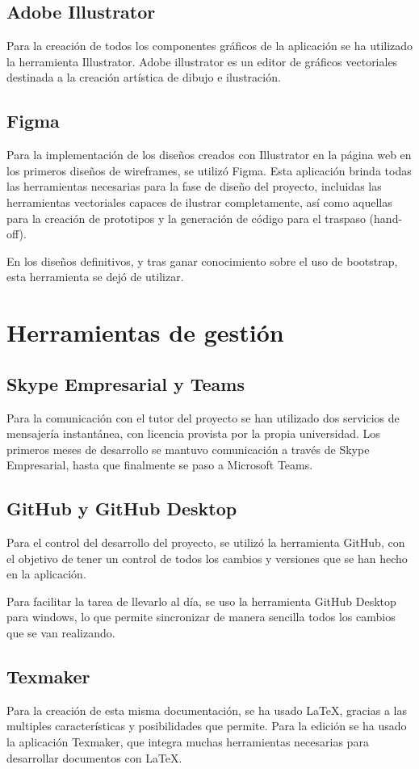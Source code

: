 \subsection{Adobe Illustrator}
Para la creación de todos los componentes gráficos de la aplicación se ha utilizado la herramienta Illustrator. Adobe illustrator es un editor de gráficos vectoriales destinada a la creación artística de dibujo e ilustración.

\subsection{Figma}
Para la implementación de los diseños creados con Illustrator en la página web en los primeros diseños de wireframes, se utilizó Figma. Esta aplicación brinda todas las herramientas necesarias para la fase de diseño del proyecto, incluidas las herramientas vectoriales capaces de ilustrar completamente, así como aquellas para la creación de prototipos y la generación de código para el traspaso (hand-off). 

En los diseños definitivos, y tras ganar conocimiento sobre el uso de bootstrap, esta herramienta se dejó de utilizar.

\section{Herramientas de gestión}

\subsection{Skype Empresarial y Teams}

Para la comunicación con el tutor del proyecto se han utilizado dos servicios de mensajería instantánea, con licencia provista por la propia universidad. Los primeros meses de desarrollo se mantuvo comunicación a través de Skype Empresarial, hasta que finalmente se paso a Microsoft Teams.

\subsection{GitHub y GitHub Desktop}

Para el control del desarrollo del proyecto, se utilizó la herramienta GitHub, con el objetivo de tener un control de todos los cambios y versiones que se han hecho en la aplicación. 

Para facilitar la tarea de llevarlo al día, se uso la herramienta GitHub Desktop para windows, lo que permite sincronizar de manera sencilla todos los cambios que se van realizando.

\subsection{Texmaker}

Para la creación de esta misma documentación, se ha usado LaTeX, gracias a las multiples características y posibilidades que permite. Para la edición se ha usado la aplicación Texmaker, que integra muchas herramientas necesarias para desarrollar documentos con LaTeX.
